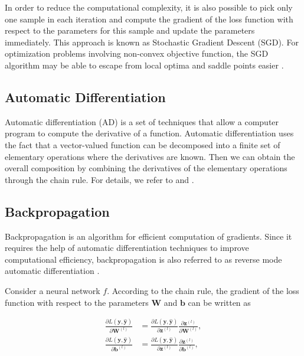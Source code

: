 \documentclass[
	parskip, 			   %
	twoside, 			   %
	DIV=14, 			   %
	BCOR=15.0mm, 		   %
	headsepline, 		   %
	open=right, 		   %
	captions=tableheading, %
	bibliography=totoc,    %
	numbers=noenddot       %
]{scrreprt}
\begin{document}
In order to reduce the computational complexity, it is also possible to pick only one sample in each iteration and compute the gradient of the loss function with respect to the parameters for this sample and update the parameters immediately. This approach is known as Stochastic Gradient Descent (SGD). For optimization problems involving non-convex objective function, the SGD algorithm may be able to escape from local optima and saddle points easier \cite{sun2019survey}.

\subsection{Automatic Differentiation}
Automatic differentiation (AD) is a set of techniques that allow a computer program to compute the derivative of a function. Automatic differentiation uses the fact that a vector-valued function can be decomposed into a finite set of elementary operations where the derivatives are known. Then we can obtain the overall composition by combining the derivatives of the elementary operations through the chain rule. For details, we refer to \cite{baydin2018automatic} and \cite{margossian2019review}.

\subsection{Backpropagation}
Backpropagation is an algorithm for efficient computation of gradients. Since it requires the help of automatic differentiation techniques to improve computational efficiency, backpropagation is also referred to as reverse mode automatic differentiation \cite{baydin2018automatic}.

Consider a neural network $f$. According to the chain rule, the gradient of the loss function with respect to the parameters $\mathbf{W}$ and $\mathbf{b}$ can be written as

\begin{equation}
    \label{eq:Chain_rule_partial}
    \begin{aligned}
        \frac{\partial L\left( \mathbf{y}, \hat{\mathbf{y}} \right)}{\partial \mathbf{W}^{(l)}} &= \frac{\partial L \left( \mathbf{y}, \hat{\mathbf{y}} \right)}{\partial \mathbf{z}^{(l)}} 
        \frac{\partial \mathbf{z}^{(l)}}{\partial \mathbf{W}^{(l)}},
        \\
        \frac{\partial L\left( \mathbf{y}, \hat{\mathbf{y}} \right)}{\partial \mathbf{b}^{(l)}} &= \frac{\partial L \left( \mathbf{y}, \hat{\mathbf{y}} \right)}{\partial \mathbf{z}^{(l)}} 
        \frac{\partial \mathbf{z}^{(l)}}{\partial \mathbf{b}^{(l)}},
    \end{aligned}
\end{equation}
\end{document}
